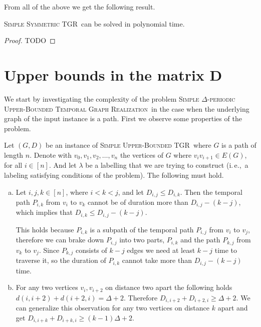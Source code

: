 \documentclass[a4paper,UKenglish,cleveref, autoref, thm-restate]{lipics-v2021}
\newcommand{\ie}{i.\,e.,\ }
\newcommand{\deltaSymExact}{\textsc{Simple Symmetric TGR}}
\newcommand{\DeltaUpperBoundLong}{\textsc{Simple $\Delta$-periodic Upper-Bounded Temporal Graph Realization}}
\newcommand{\deltaUpperBound}{\textsc{Simple Upper-Bounded TGR}}
\begin{document}
From all of the above we get the following result.
\begin{theorem}
	\deltaSymExact\ can be solved in polynomial time.
\end{theorem}

\begin{proof}
	TODO
\end{proof}

\section{Upper bounds in the matrix D}
We start by investigating the complexity of the problem \DeltaUpperBoundLong\ in the case when the underlying graph of the input instance is a path.
First we observe some properties of the problem.

Let $(G,D)$ be an instance of \deltaUpperBound\, where $G$ is a path of length $n$.
Denote with $v_0,v_1, v_2, \dots, v_n$ the vertices of $G$ where $v_{i}v_{i+1} \in E(G)$, for all $i \in [n]$.
And let $\lambda$ be a labelling that we are trying to construct (\ie a labeling satisfying conditions of the problem).
The following must hold.
\begin{enumerate}[(a)]
	\item \label{path:enum-1}
 Let $i,j,k \in [n]$, where $i < k < j$, and let $D_{i,j} \leq D_{i,k}$. 
 Then the temporal path $P_{i,k}$ from $v_i$ to $v_k$ cannot be of duration more than $D_{i,j} - (k-j)$,
 which implies that $D_{i,k} \leq D_{i,j} - (k-j)$.
 
 This holds because $P_{i,k}$ is a subpath of the temporal path $P_{i,j}$ from $v_i$ to $v_j$,
 therefore we can brake down $P_{i,j}$ into two parts, $P_{i,k}$ and the path $P_{k,j}$ from $v_k$ to $v_j$.
 Since $P_{k,j}$ consists of $k-j$ edges we need at least $k-j$ time to traverse it, so the duration of $P_{i,k}$ cannot take more than $D_{i,j} - (k-j)$ time.

    \item \label{path:enum-2}
     For any two vertices $v_i, v_{i+2}$ on distance two apart the following holds $d(i, i+2) + d(i+2, i) = \Delta + 2$.
     Therefore $D_{i,i+2} + D_{i+2,i} \geq \Delta + 2$.
     We can generalize this observation for any two vertices on distance $k$ apart and get 
     $D_{i,i+k} + D_{i+k,i} \geq (k-1) \Delta + 2$.

\end{enumerate}
\end{document}
